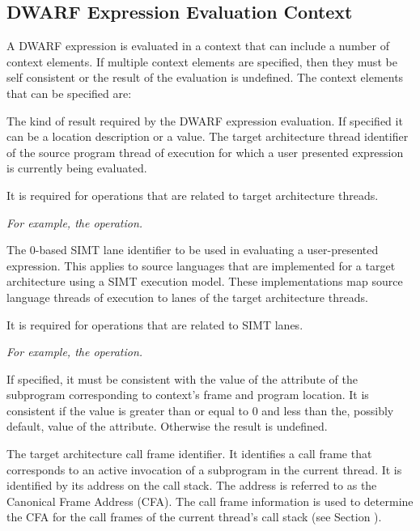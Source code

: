 \subsection{DWARF Expression Evaluation Context}
\label{chap:expressionevaluationcontext}
A DWARF expression is evaluated in a context that can include a number
of context elements. If multiple context elements are specified, then
they must be self consistent or the result of the evaluation is
undefined. The context elements that can be specified are:
\begin{enumerate}[1. ]
The kind of result required by the DWARF expression evaluation. If
specified it can be a location description or a value.
The target architecture thread identifier of the source program thread
of execution for which a user presented expression is currently being
evaluated.

It is required for operations that are related to target architecture
threads.

\textit{For example, the  \DWOPformtlsaddressNAME{} operation.}

The 0-based SIMT lane identifier to be used in evaluating a
user-presented expression. This applies to source languages that are
implemented for a target architecture using a SIMT execution
model. These implementations map source language threads of execution
to lanes of the target architecture threads.

It is required for operations that are related to SIMT lanes.

\textit{For example, the \DWOPpushlaneNAME{} operation.}

If specified, it must be consistent with the value of the
 \DWATnumlanes{} attribute of the subprogram corresponding to context’s
frame and program location. It is consistent if the value is greater
than or equal to 0 and less than the, possibly default, value of the
\DWATnumlanes{} attribute. Otherwise the result is undefined.

The target architecture call frame identifier. It identifies a call
frame that corresponds to an active invocation of a subprogram in the
current thread. It is identified by its address on the call stack. The
address is referred to as the Canonical Frame Address (CFA). The call
frame information is used to determine the CFA for the call frames of
the current thread’s call stack (see Section
).


\end{enumerate}
